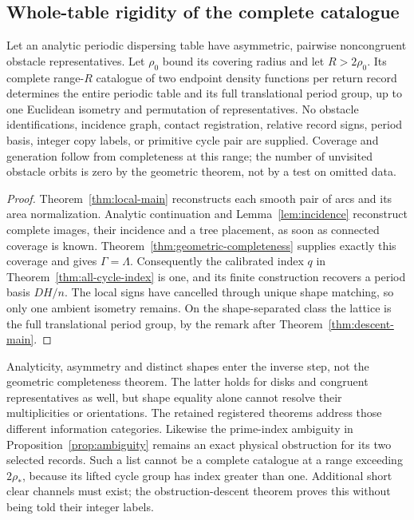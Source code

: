 \subsection{Whole-table rigidity of the complete catalogue}
\begin{theorem}\label{thm:catalogue-rigidity}
Let an analytic periodic dispersing table have asymmetric, pairwise
noncongruent obstacle representatives. Let $\rho_0$ bound its covering
radius and let $R>2\rho_0$. Its complete range-$R$ catalogue of two
endpoint density functions per return record determines the entire
periodic table and its full translational period group, up to one
Euclidean isometry and permutation of representatives. No obstacle
identifications, incidence graph, contact registration, relative record
signs, period basis, integer copy labels, or primitive cycle pair are
supplied. Coverage and generation follow from completeness at this
range; the number of unvisited obstacle orbits is zero by the geometric
theorem, not by a test on omitted data.
\end{theorem}
\begin{proof}
Theorem~\ref{thm:local-main} reconstructs each smooth pair of arcs and
its area normalization. Analytic continuation and
Lemma~\ref{lem:incidence} reconstruct complete images, their incidence
and a tree placement, as soon as connected coverage is known.
Theorem~\ref{thm:geometric-completeness} supplies exactly this coverage
and gives $\Gamma=\Lambda$. Consequently the calibrated index $q$ in
Theorem~\ref{thm:all-cycle-index} is one, and its finite construction
recovers a period basis $DH/n$. The local signs have cancelled through
unique shape matching, so only one ambient isometry remains. On the
shape-separated class the lattice is the full translational period
group, by the remark after Theorem~\ref{thm:descent-main}.
\end{proof}

Analyticity, asymmetry and distinct shapes enter the inverse step, not
the geometric completeness theorem. The latter holds for disks and
congruent representatives as well, but shape equality alone cannot
resolve their multiplicities or orientations. The retained registered
theorems address those different information categories. Likewise the
prime-index ambiguity in Proposition~\ref{prop:ambiguity} remains an
exact physical obstruction for its two selected records. Such a list
cannot be a complete catalogue at a range exceeding $2\rho_*$, because
its lifted cycle group has index greater than one. Additional short
clear channels must exist; the obstruction-descent theorem proves this
without being told their integer labels.

